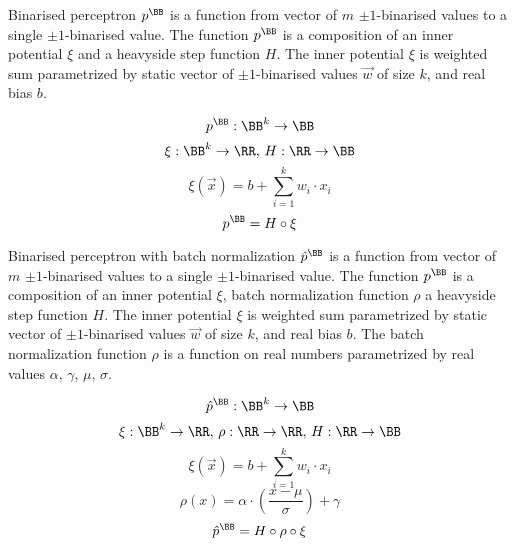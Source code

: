 \begin{definition}\label{def:binarised_perceptron}
Binarised perceptron $p^\BB$ is a function from vector of $m$ $\pm 1$-binarised values
to a single $\pm 1$-binarised value.
The function $p^\BB$ is a composition of an inner potential $\xi$
and a heavyside step function $H$. The inner potential $\xi$ is weighted sum
parametrized by static vector of $\pm 1$-binarised values
$\vec w$ of size $k$, and real bias $b$.

\begin{equation*}
	p^\BB: \BB^k \to \BB
\end{equation*}
\begin{equation*}
	\xi: \BB^k \to \RR, \,
	H: \RR \to \BB
\end{equation*}
\begin{equation*}
	\xi(\vec x) = b + \sum_{i=1}^k w_i\cdot x_i
\end{equation*}
\begin{equation*}
	p^\BB = H \circ \xi
\end{equation*}
\end{definition}

\begin{definition}\label{def:perceptron_bn}
Binarised perceptron with batch normalization $\hat{p}^\BB$
is a function from vector of $m$ $\pm 1$-binarised values
to a single $\pm 1$-binarised value.
The function $p^\BB$ is a composition of an inner potential $\xi$,
batch normalization function $\rho$ a heavyside step function $H$.
The inner potential $\xi$ is weighted sum parametrized by static vector
of $\pm 1$-binarised values $\vec w$ of size $k$, and real bias $b$.
The batch normalization function $\rho$ is a function on real numbers
parametrized by real values $\alpha$, $\gamma$, $\mu$, $\sigma$.

\begin{equation*}
	\hat{p}^\BB: \BB^k \to \BB
\end{equation*}
\begin{equation*}
	\xi: \BB^k \to \RR, \,
	\rho: \RR \to \RR, \,
	H: \RR \to \BB
\end{equation*}
\begin{equation*}
	\xi(\vec x) = b + \sum_{i=1}^k w_i\cdot x_i
\end{equation*}
\begin{equation*}
	\rho(x) = \alpha\cdot \left(\frac{x-\mu}{\sigma}\right) + \gamma
\end{equation*}
\begin{equation*}
	\hat{p}^\BB = H \circ \rho \circ \xi
\end{equation*}
\end{definition}

